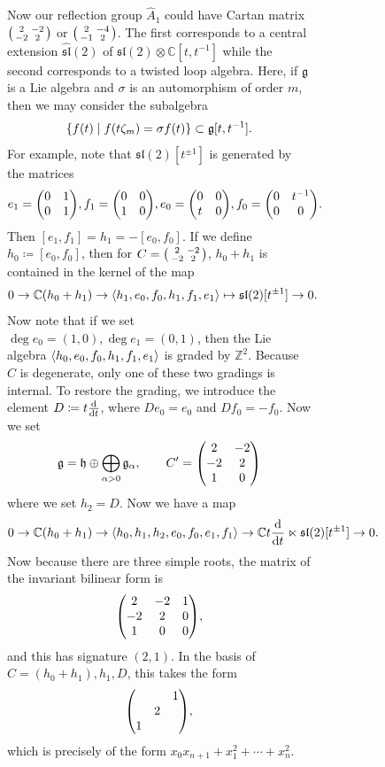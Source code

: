\documentclass[leqno, openany]{memoir}
\theoremstyle{definition}
\theoremstyle{remark}
\theoremstyle{plain}
\theoremstyle{definition}
\theoremstyle{remark}
\newcommand{\C}{\mathbb{C}}
\newcommand{\Z}{\mathbb{Z}}
\newcommand{\mf}[1]{\mathfrak{#1}}
\newcommand{\wh}[1]{\widehat{#1}}
\begin{document}
\begin{figure}[H]
\begin{figure}[H]
Now our reflection group $\wh{A}_1$ could have Cartan matrix
$\begin{psmallmatrix} 2 & -2 \\ -2 & 2 \end{psmallmatrix}$ or
$\begin{psmallmatrix} 2 & -4 \\ -1 & 2 \end{psmallmatrix}$. The first
corresponds to a central extension $\wh{\mf{sl}}(2)$ of $\mf{sl}(2) \otimes
\C[t,t^{-1}]$ while the second corresponds to a twisted loop algebra. Here, if
$\mf{g}$ is a Lie algebra and $\sigma$ is an automorphism of order $m$, then we
may consider the subalgebra \[ \qty{f(t) \mid f(t \zeta_m) = \sigma f(t) }
\subset \mf{g}[t,t^{-1}]. \] For example, note that $\mf{sl}(2)[t^{\pm 1}]$ is
generated by the matrices \[ e_1 = \mqty(0 & 1 \\ 0 & 1), f_1 = \mqty(0 & 0 \\
    1 & 0), e_0 = \mqty(0 & 0 \\ t & 0), f_0 = \mqty(0 & t^{-1} \\ 0 & 0). \]
    Then $[e_1, f_1] = h_1 = -[e_0, f_0]$. If we define $h_0 \coloneqq [e_0,
    f_0]$, then for $C = \begin{psmallmatrix} 2 & -2 \\ -2 & 2
    \end{psmallmatrix}$, $h_0 + h_1$ is contained in the kernel of the map \[ 0
\to \C(h_0 + h_1) \to \ev{h_1, e_0, f_0, h_1, f_1, e_1} \mapsto \mf{sl}(2)
[t^{\pm 1}] \to 0. \] Now note that if we set $\deg e_0 = (1,0), \deg e_1 =
(0,1)$, then the Lie algebra $\ev{h_0, e_0, f_0, h_1, f_1, e_1}$ is graded by
$\Z^2$. Because $C$ is degenerate, only one of these two gradings is internal.
To restore the grading, we introduce the element $D \coloneqq t \dv{t}$, where
$D e_0 = e_0$ and $D f_0 = -f_0$. Now we set \[ \mf{g} = \mf{h} \oplus
    \bigoplus_{\alpha > 0} \mf{g}_{\alpha}, \qquad C' = \mqty(2 & -2 \\ -2 & 2
    \\ 1 & 0) \] where we set $h_2 = D$. Now we have a map \[ 0 \to \C(h_0 +
h_1) \to \ev{h_0, h_1, h_2, e_0, f_0, e_1, f_1} \to \C t \dv{t} \ltimes
\mf{sl}(2)[t^{\pm 1}] \to 0. \] Now because there are three simple roots, the
matrix of the invariant bilinear form is \[ \mqty(2 & -2 & 1 \\ -2 & 2 & 0 \\ 1
& 0 & 0), \] and this has signature $(2,1)$. In the basis of $C=(h_0+h_1), h_1,
D$, this takes the form \[ \mqty( & & 1 \\ & 2 & \\ 1 & & ), \] which is
precisely of the form $x_0 x_{n+1} + x_1^2 + \cdots + x_n^2$.


\end{figure}
\end{figure}
\end{document}
